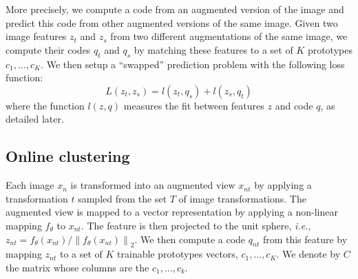 \documentclass{tufte-handout}
\begin{document}
More precisely, we compute a code from an augmented version of the image and predict this code from other augmented versions of the same image.
Given two image features $z_t$ and $z_s$ from two different augmentations of the same image, we compute their codes $q_t$ and $q_s$ by matching these features to a set of $K$ prototypes ${c_1, \ldots, c_K}$.
We then setup a ``swapped'' prediction problem with the following loss function:
\begin{equation}
  L(z_t, z_s) = l(z_t, q_s) + l(z_s, q_t)
\end{equation}
where the function $l(z,q)$ measures the fit between features $z$ and code $q$, as detailed later. 

\subsection{Online clustering}
Each image $x_n$ is transformed into an augmented view $x_{nt}$ by applying a transformation $t$ sampled from the set $T$ of image transformations.
The augmented view is mapped to a vector representation by applying a non-linear mapping $f_\theta$ to $x_{nt}$. 
The feature is then projected to the unit sphere, \textit{i.e.}, $z_{nt} = f_\theta(x_{nt}) / \left\lVert f_\theta(x_{nt}) \right\rVert_{2}$.
We then compute a code $q_{nt}$ from this feature by mapping $z_{nt}$ to a set of $K$ trainable prototypes vectors, ${c_1,\ldots, c_K}$. 
We denote by $C$ the matrix whose columns are the $c_1, \ldots, c_k$. 
\end{document}
